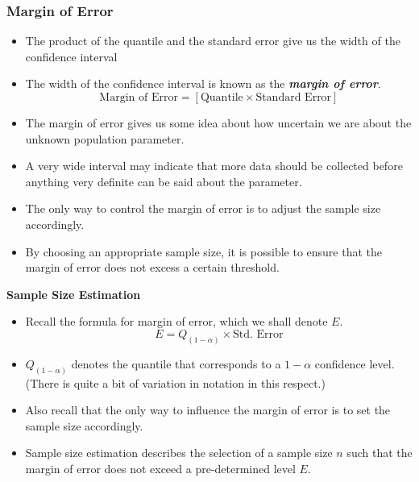 

\subsubsection{Margin of Error}

\begin{itemize}
\item The product of the quantile and the standard error give us the width of the confidence interval
\item The width of the confidence interval is known as the \textbf{\emph{margin of error}}.  \[ \mbox{Margin of Error}  = \left[ \mbox{Quantile} \times \mbox{Standard Error} \right] \]
\item The margin of error gives us some idea about how uncertain we are about the unknown population parameter. \item A very wide interval may indicate that more data should be collected before anything very definite can be said about the parameter.
\item The only way to control the margin of error is to adjust the sample size accordingly.
\item By choosing an appropriate sample size, it is possible to ensure that the margin of error does not excess a certain threshold.
\end{itemize}




\textbf{Sample Size Estimation}

\begin{itemize} \item  Recall the formula for margin of error, which we shall denote $E$.
\[  E = Q_{(1-\alpha)} \times \mbox{Std. Error}\]

\item  $Q_{(1-\alpha)}$ denotes the quantile that corresponds to a $1-\alpha$ confidence level. (There is quite a bit of variation in notation in this respect.)
\item  Also recall that the only way to influence the margin of error is to set the sample size accordingly.

\item  Sample size estimation describes the selection of a sample size $n$ such that the margin of error does not exceed a pre-determined level $E$.
\end{itemize}


